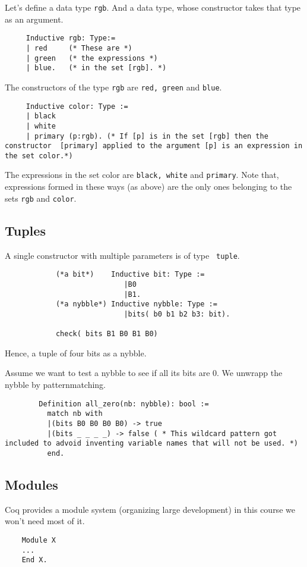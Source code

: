 	 Let's define a data type \lstinline!rgb!. And a data type, whose constructor takes that type as an argument.
	\begin{lstlisting}
	 Inductive rgb: Type:=
	 | red     (* These are *)
	 | green   (* the expressions *)
	 | blue.   (* in the set [rgb]. *)
	 \end{lstlisting}
	 The constructors of the type \lstinline!rgb! are  \lstinline!red, green! and \lstinline!blue!. 
	 
	 \begin{lstlisting}
	 Inductive color: Type := 
	 | black
	 | white
	 | primary (p:rgb). (* If [p] is in the set [rgb] then the constructor  [primary] applied to the argument [p] is an expression in the set color.*) 
	 \end{lstlisting}
	 
	 The expressions in the set color are \lstinline!black, white! and \lstinline!primary!.
	 Note that, expressions formed in these ways (as above) are the only ones belonging to the sets \lstinline!rgb! and \lstinline!color!.
	 

\subsection{Tuples}

    A single constructor with multiple parameters is of type \lstinline! tuple!.
	\begin{example}
 	 	\begin{lstlisting}
 	 		(*a bit*)    Inductive bit: Type := 
 	 						|B0
 	 						|B1.
 		    (*a nybble*) Inductive nybble: Type := 
 		   				 	|bits( b0 b1 b2 b3: bit).
 		   				 	
 		   	check( bits B1 B0 B1 B0)
 		\end{lstlisting}
 		Hence, a tuple of four bits as a nybble.
 		
 		Assume we want to test a nybble to see if all its bits are 0. We unwrapp the nybble by patternmatching.
 		\begin{lstlisting}
 		Definition all_zero(nb: nybble): bool :=
 		  match nb with
 		  |(bits B0 B0 B0 B0) -> true
 		  |(bits _ _ _ _) -> false ( * This wildcard pattern got included to advoid inventing variable names that will not be used. *) 
 		  end.
 		 \end{lstlisting}
 	\end{example}
 	

\subsection{Modules}
	Coq provides a module system (organizing large development) in this course we won't need most of it.
	\begin{lstlisting}
	Module X 
	...
	End X.
	\end{lstlisting}

